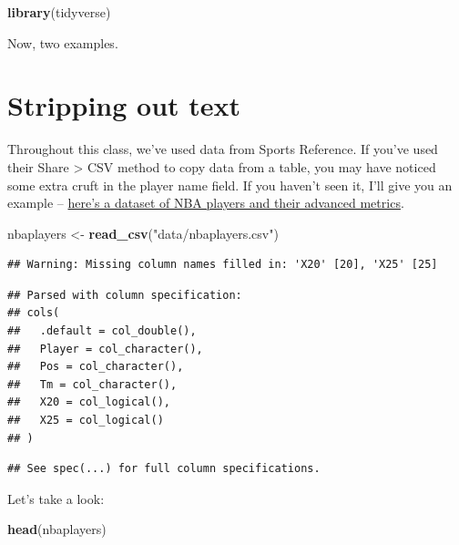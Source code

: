 \documentclass[]{book}
\newenvironment{Shaded}{\begin{snugshade}}{\end{snugshade}}
\newcommand{\KeywordTok}[1]{\textcolor[rgb]{0.13,0.29,0.53}{\textbf{#1}}}
\newcommand{\NormalTok}[1]{#1}
\newcommand{\StringTok}[1]{\textcolor[rgb]{0.31,0.60,0.02}{#1}}
\begin{document}
\begin{Shaded}
\begin{Highlighting}[]
\KeywordTok{library}\NormalTok{(tidyverse)}
\end{Highlighting}
\end{Shaded}

Now, two examples.

\hypertarget{stripping-out-text}{%
\section{Stripping out text}\label{stripping-out-text}}

Throughout this class, we've used data from Sports Reference. If you've used their Share \textgreater{} CSV method to copy data from a table, you may have noticed some extra cruft in the player name field. If you haven't seen it, I'll give you an example -- \href{https://unl.box.com/s/bx89eg0ooccpovm3ii7jnbjj3xaby2qd}{here's a dataset of NBA players and their advanced metrics}.

\begin{Shaded}
\begin{Highlighting}[]
\NormalTok{nbaplayers <-}\StringTok{ }\KeywordTok{read_csv}\NormalTok{(}\StringTok{"data/nbaplayers.csv"}\NormalTok{)}
\end{Highlighting}
\end{Shaded}

\begin{verbatim}
## Warning: Missing column names filled in: 'X20' [20], 'X25' [25]
\end{verbatim}

\begin{verbatim}
## Parsed with column specification:
## cols(
##   .default = col_double(),
##   Player = col_character(),
##   Pos = col_character(),
##   Tm = col_character(),
##   X20 = col_logical(),
##   X25 = col_logical()
## )
\end{verbatim}

\begin{verbatim}
## See spec(...) for full column specifications.
\end{verbatim}

Let's take a look:

\begin{Shaded}
\begin{Highlighting}[]
\KeywordTok{head}\NormalTok{(nbaplayers)}
\end{Highlighting}
\end{Shaded}
\end{document}
